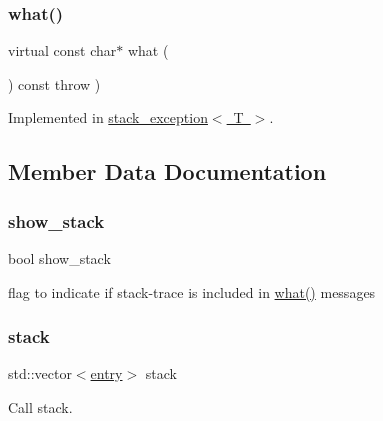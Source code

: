 \subsubsection{\texorpdfstring{what()}{what()}}
{\footnotesize\ttfamily virtual const char$\ast$ what (\begin{DoxyParamCaption}{ }\end{DoxyParamCaption}) const throw  ) \hspace{0.3cm}{\ttfamily [pure virtual]}}



Implemented in \mbox{\hyperlink{classstacktrace_1_1stack__exception_ad62489809e3df568e973597b928d6d9b}{stack\+\_\+exception$<$ T $>$}}.



\subsection{Member Data Documentation}
\mbox{\label{classstacktrace_1_1stack__exception__base_a328e39311a54853f3f733b0a5be56a2a}} 
\subsubsection{\texorpdfstring{show\+\_\+stack}{show\_stack}}
{\footnotesize\ttfamily bool show\+\_\+stack}



flag to indicate if stack-\/trace is included in \mbox{\hyperlink{classstacktrace_1_1stack__exception__base_a926844cae0786e6c6192f557a12e39f0}{what()}} messages 

\mbox{\label{classstacktrace_1_1call__stack_a2a3ab0b5bb69cd4a275f3f344d3cc6cd}} 
\subsubsection{\texorpdfstring{stack}{stack}}
{\footnotesize\ttfamily std\+::vector$<$\mbox{\hyperlink{structstacktrace_1_1entry}{entry}}$>$ stack\hspace{0.3cm}{\ttfamily [inherited]}}



Call stack. 

